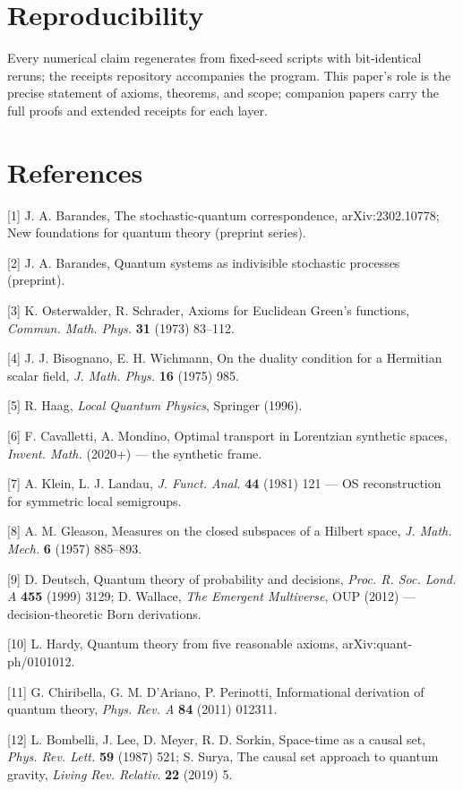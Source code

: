 \documentclass[11pt]{article}
\begin{document}
\section*{Reproducibility}
Every numerical claim regenerates from fixed-seed scripts with bit-identical reruns; the receipts repository accompanies the program.  This paper's role is the precise statement of axioms, theorems, and scope; companion papers carry the full proofs and extended receipts for each layer.

\section*{References}
[1] J. A. Barandes, The stochastic-quantum correspondence, arXiv:2302.10778; New foundations for quantum theory (preprint series).

[2] J. A. Barandes, Quantum systems as indivisible stochastic processes (preprint).

[3] K. Osterwalder, R. Schrader, Axioms for Euclidean Green's functions, \emph{Commun. Math. Phys.} \textbf{31} (1973) 83–112.

[4] J. J. Bisognano, E. H. Wichmann, On the duality condition for a Hermitian scalar field, \emph{J. Math. Phys.} \textbf{16} (1975) 985.

[5] R. Haag, \emph{Local Quantum Physics}, Springer (1996).

[6] F. Cavalletti, A. Mondino, Optimal transport in Lorentzian synthetic spaces, \emph{Invent. Math.} (2020+) — the synthetic frame.

[7] A. Klein, L. J. Landau, \emph{J. Funct. Anal.} \textbf{44} (1981) 121 — OS reconstruction for symmetric local semigroups.

[8] A. M. Gleason, Measures on the closed subspaces of a Hilbert space, \emph{J. Math. Mech.} \textbf{6} (1957) 885–893.

[9] D. Deutsch, Quantum theory of probability and decisions, \emph{Proc. R. Soc. Lond. A} \textbf{455} (1999) 3129; D. Wallace, \emph{The Emergent Multiverse}, OUP (2012) — decision-theoretic Born derivations.

[10] L. Hardy, Quantum theory from five reasonable axioms, arXiv:quant-ph/0101012.

[11] G. Chiribella, G. M. D'Ariano, P. Perinotti, Informational derivation of quantum theory, \emph{Phys. Rev. A} \textbf{84} (2011) 012311.

[12] L. Bombelli, J. Lee, D. Meyer, R. D. Sorkin, Space-time as a causal set, \emph{Phys. Rev. Lett.} \textbf{59} (1987) 521; S. Surya, The causal set approach to quantum gravity, \emph{Living Rev. Relativ.} \textbf{22} (2019) 5.
\end{document}
